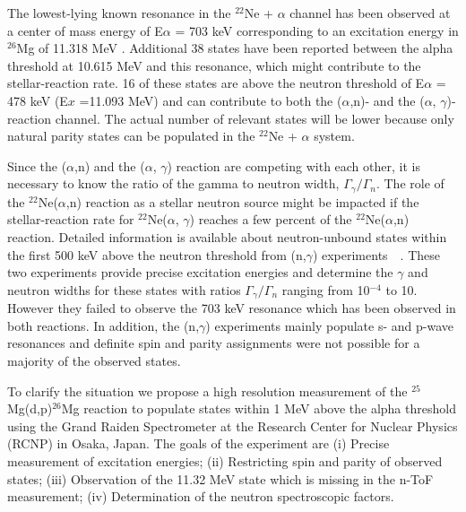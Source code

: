 The lowest-lying known resonance in the $^{22}$Ne + $\alpha$  channel has been observed at a center of mass energy of E$\alpha$ = 703 keV corresponding to an excitation energy in $^{26}$Mg of 11.318 MeV \citep{Wolke1989}\citep{Jaeger2001}. Additional 38 states have been reported between the alpha threshold at 10.615 MeV and this resonance, which might contribute to the stellar-reaction rate. 16 of these states are above the neutron threshold of E$\alpha$ = 478 keV (E$x$ =11.093 MeV) and can contribute to both the ($\alpha$,n)- and the ($\alpha$, $\gamma$)-reaction channel. The actual number of relevant states will be lower because only natural parity states can be populated in the  $^{22}$Ne + $\alpha$ system.

Since the ($\alpha$,n) and the ($\alpha$, $\gamma$) reaction are competing with each other, it is necessary to know the ratio of the  gamma to neutron width, $\Gamma_{\gamma}/\Gamma_{n}$.
The role of the $^{22}$Ne($\alpha$,n) reaction as a stellar neutron source might be impacted if the stellar-reaction rate for $^{22}$Ne($\alpha$, $\gamma$) reaches a few percent of the $^{22}$Ne($\alpha$,n) reaction. Detailed information is available about neutron-unbound states within the first 500 keV above the neutron threshold from (n,$\gamma$) experiments~\citep{Massimi}~\citep{Koehler2002}. These two experiments provide precise excitation energies and determine the $\gamma$ and neutron widths for these states with ratios $\Gamma_{\gamma}/\Gamma_{n}$ ranging from 10$^{-4}$ to 10. However they failed to observe the 703 keV resonance which has been observed in both reactions. In addition, the (n,$\gamma$) experiments mainly populate s- and p-wave resonances and definite spin and parity assignments were not possible for a majority of the observed states.

To clarify the situation we propose a high resolution measurement of the $^{25}$Mg(d,p)$^{26}$Mg
reaction to populate states within 1 MeV above the alpha threshold using the Grand Raiden Spectrometer at the Research Center for Nuclear
Physics (RCNP) in Osaka, Japan. The goals of  the experiment are (i) Precise measurement of excitation energies; (ii) Restricting spin and parity of observed states; (iii) Observation of the 11.32 MeV state which is missing in the n-ToF measurement; (iv) Determination of the neutron spectroscopic factors.

%
% 
% 
